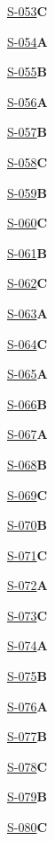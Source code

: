 \noindent\hyperref[q:S-053]{S-053}\hfill\textbf{C}\par
\noindent\hyperref[q:S-054]{S-054}\hfill\textbf{A}\par
\noindent\hyperref[q:S-055]{S-055}\hfill\textbf{B}\par
\noindent\hyperref[q:S-056]{S-056}\hfill\textbf{A}\par
\noindent\hyperref[q:S-057]{S-057}\hfill\textbf{B}\par
\noindent\hyperref[q:S-058]{S-058}\hfill\textbf{C}\par
\noindent\hyperref[q:S-059]{S-059}\hfill\textbf{B}\par
\noindent\hyperref[q:S-060]{S-060}\hfill\textbf{C}\par
\noindent\hyperref[q:S-061]{S-061}\hfill\textbf{B}\par
\noindent\hyperref[q:S-062]{S-062}\hfill\textbf{C}\par
\noindent\hyperref[q:S-063]{S-063}\hfill\textbf{A}\par
\noindent\hyperref[q:S-064]{S-064}\hfill\textbf{C}\par
\noindent\hyperref[q:S-065]{S-065}\hfill\textbf{A}\par
\noindent\hyperref[q:S-066]{S-066}\hfill\textbf{B}\par
\noindent\hyperref[q:S-067]{S-067}\hfill\textbf{A}\par
\noindent\hyperref[q:S-068]{S-068}\hfill\textbf{B}\par
\noindent\hyperref[q:S-069]{S-069}\hfill\textbf{C}\par
\noindent\hyperref[q:S-070]{S-070}\hfill\textbf{B}\par
\noindent\hyperref[q:S-071]{S-071}\hfill\textbf{C}\par
\noindent\hyperref[q:S-072]{S-072}\hfill\textbf{A}\par
\noindent\hyperref[q:S-073]{S-073}\hfill\textbf{C}\par
\noindent\hyperref[q:S-074]{S-074}\hfill\textbf{A}\par
\noindent\hyperref[q:S-075]{S-075}\hfill\textbf{B}\par
\noindent\hyperref[q:S-076]{S-076}\hfill\textbf{A}\par
\noindent\hyperref[q:S-077]{S-077}\hfill\textbf{B}\par
\noindent\hyperref[q:S-078]{S-078}\hfill\textbf{C}\par
\noindent\hyperref[q:S-079]{S-079}\hfill\textbf{B}\par
\noindent\hyperref[q:S-080]{S-080}\hfill\textbf{C}\par

